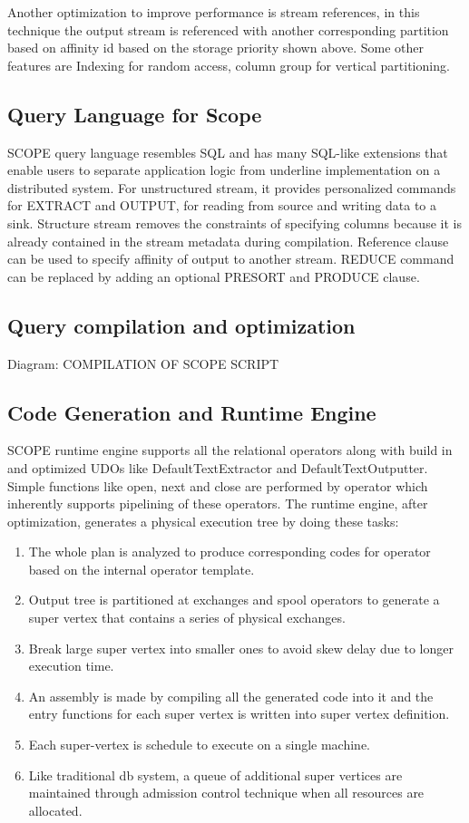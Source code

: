\documentclass[runningheads,a4paper]{llncs}
\begin{document}
Another optimization to improve performance is stream references, in this technique the output stream is referenced with another corresponding partition based on affinity id based on the storage priority shown above. Some other features are Indexing for random access, column group for vertical partitioning.\\

\subsection*{Query Language for Scope}
SCOPE query language resembles SQL and has many SQL-like extensions that enable users to separate application logic from underline implementation on a distributed system. For unstructured stream, it provides personalized commands for EXTRACT and OUTPUT, for reading from source and writing data to a sink. Structure stream removes the constraints of specifying columns because it is already contained in the stream metadata during compilation. Reference clause can be used to specify affinity of output to another stream. REDUCE command can be replaced by adding an optional PRESORT and PRODUCE clause.

\subsection*{Query compilation and optimization}
Diagram: COMPILATION OF SCOPE SCRIPT

\subsection*{Code Generation and Runtime Engine}
SCOPE runtime engine supports all the relational operators along with build in and optimized UDOs like DefaultTextExtractor and DefaultTextOutputter. Simple functions like open, next and close are performed by operator which inherently supports pipelining of these operators.  The runtime engine, after optimization, generates a physical execution tree by doing these tasks:
\begin{enumerate}
	\item The whole plan is analyzed to produce corresponding codes for operator based on the internal operator template.
	\item  Output tree is partitioned at exchanges and spool operators to generate a super vertex that contains a series of physical exchanges.
	\item Break large super vertex into smaller ones to avoid skew delay due to longer execution time.
	\item An assembly is made by compiling all the generated code into it and the entry functions for each super vertex is written into super vertex definition.
	\item Each super-vertex is schedule to execute on a single machine.
	\item Like traditional db system, a queue of additional super vertices are maintained through admission control technique when all resources are allocated.
\end{enumerate}
\end{document}
